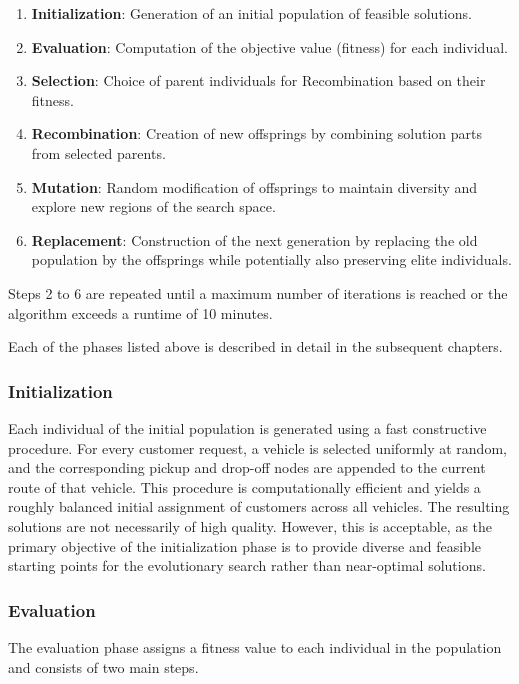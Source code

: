 \documentclass[12pt]{article}
\begin{document}
\begin{enumerate}
    \item \textbf{Initialization}: Generation of an initial population of feasible solutions.
    \item \textbf{Evaluation}: Computation of the objective value (fitness) for each individual.
    \item \textbf{Selection}: Choice of parent individuals for Recombination based on their fitness.
    \item \textbf{Recombination}: Creation of new offsprings by combining solution parts from selected parents.
    \item \textbf{Mutation}: Random modification of offsprings to maintain diversity and explore new regions of the search space.
    \item \textbf{Replacement}: Construction of the next generation by replacing the old population by the offsprings while potentially also preserving elite individuals.
\end{enumerate}

Steps 2 to 6 are repeated until a maximum number of iterations is reached or the algorithm exceeds a runtime of 10 minutes.



Each of the phases listed above is described in detail in the subsequent chapters.

\subsubsection{Initialization}

Each individual of the initial population is generated using a fast constructive procedure. For every customer request, a vehicle is selected uniformly at random, and the corresponding pickup and drop-off nodes are appended to the current route of that vehicle. This procedure is computationally efficient and yields a roughly balanced initial assignment of customers across all vehicles. The resulting solutions are not necessarily of high quality. However, this is acceptable, as the primary objective of the initialization phase is to provide diverse and feasible starting points for the evolutionary search rather than near-optimal solutions.


\subsubsection{Evaluation}

The evaluation phase assigns a fitness value to each individual in the population and consists of two main steps.
\end{document}
